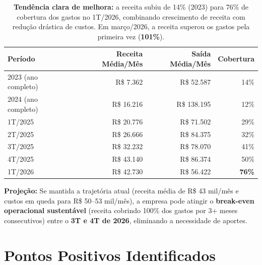 \documentclass[12pt, a4paper]{article}
\newcommand{\reais}[1]{R\$ #1}
\begin{document}
\begin{table}[H]
    \centering
    \small
    \renewcommand{\arraystretch}{1.4}
    \begin{tabularx}{\textwidth}{X r r r}
        \toprule
        \rowcolor{tableHeader} \textbf{Período} & \textbf{Receita Média/Mês} & \textbf{Saída Média/Mês} & \textbf{Cobertura} \\
        \midrule
        2023 (ano completo) & \reais{7.362} & \reais{52.587} & 14\% \\
        2024 (ano completo) & \reais{16.216} & \reais{138.195} & 12\% \\
        1T/2025 & \reais{20.776} & \reais{71.502} & 29\% \\
        2T/2025 & \reais{26.666} & \reais{84.375} & 32\% \\
        3T/2025 & \reais{32.232} & \reais{78.070} & 41\% \\
        4T/2025 & \reais{43.140} & \reais{86.374} & 50\% \\
        \rowcolor{successGreen!15} 1T/2026 & \reais{42.730} & \reais{56.422} & \textbf{76\%} \\
        \bottomrule
    \end{tabularx}
    \caption*{\footnotesize \textcolor{successGreen}{\textbf{Tendência clara de melhora:}} a receita subiu de 14\% (2023) para 76\% de cobertura dos gastos no 1T/2026, combinando crescimento de receita com redução drástica de custos. Em março/2026, a receita superou os gastos pela primeira vez (\textbf{101\%}).}
\end{table}

\textbf{Projeção:} Se mantida a trajetória atual (receita média de R\$ 43 mil/mês e custos em queda para R\$ 50--53 mil/mês), a empresa pode atingir o \textbf{break-even operacional sustentável} (receita cobrindo 100\% dos gastos por 3+ meses consecutivos) entre o \textbf{3T e 4T de 2026}, eliminando a necessidade de aportes.

\newpage
\section{Pontos Positivos Identificados}
\end{document}
